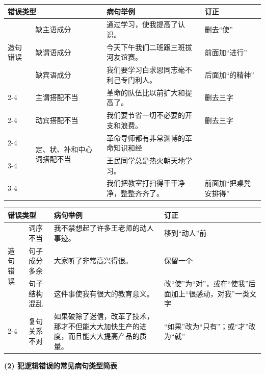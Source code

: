 \noindent
\begin{tabular}{|lp{5em}|p{8em}|p{6em}|}
	\hline
	\multicolumn{2}{|l|}{错误类型} & 病句举例 & 订正\\
	\hline
	\multicolumn{1}{|l|}{\multirow{3}{*}{造句错误}} & 缺主语成分  & 通过学习，使我提高了认识。 &删去“使” \\ \cline{2-4} 
	\multicolumn{1}{|l|}{} & 缺谓语成分 & 今天下午我们二班跟三班拔河友谊赛。 & 前面加“进行”\\ \cline{2-4}
	\multicolumn{1}{|l|}{} & 缺宾语成分 & 我们要学习白求恩同志毫不利己专门利人。 & 后面加“的精神”\\ \cline{2-4}
	\multicolumn{1}{|l|}{} & 主谓搭配不当 & 革命的队伍比以前扩大和提高了。 & 删去三字\\ \cline{2-4}
	\multicolumn{1}{|l|}{} & 动宾搭配不当 & 我们要节省一切不必要的开支和浪费。 & 删去三字\\ \cline{2-4}
	\multicolumn{1}{|l|}{} & \multirow{2}{*}{定、状、补和中心词搭配不当} & 革命导师都有非常渊博的革命知识和经 & \\ \cline{3-4} 
	\multicolumn{1}{|l|}{} & & 王民同学总是热火朝天地学习。 & \\ \cline{3-4}
	\multicolumn{1}{|l|}{} & & 我们把教室打扫得干干净净，整整齐齐了。 & 前面加“把桌凳安排得” \\
	\hline
\end{tabular}

\noindent
\begin{tabular}{|lp{3em}|p{8em}|p{8em}|}
	\hline
	\multicolumn{2}{|l|}{错误类型} & 病句举例 & 订正\\
	\hline
	\multicolumn{1}{|l|}{\multirow{3}{*}{造句错误}} & 词序不当 &  我不禁想起了许多王老师的动人事迹。 &  移到“动人”前\\ \cline{2-4}
	\multicolumn{1}{|l|}{} & 句子成分多余 & 大家听了非常高兴得很。 & 保留一个\\ \cline{2-4}
	\multicolumn{1}{|l|}{} & 句子结构混乱 & 这件事使我有很大的教育意义。 & 改“使”为“对”，或在“使我”后面加上“很感动，对我”一类文字\\ \cline{2-4}
	\multicolumn{1}{|l|}{} & 复句关系不对 & 如果破除了迷信，改革了技术，那才不但能大大加快生产的进度，而且能大大提高产品的质量。 &  “如果”改为“只有”；或“才”改为“就”\\
	\hline
\end{tabular}

\vspace{2em}
\textbf{(2) 犯逻辑错误的常见病句类型简表}

